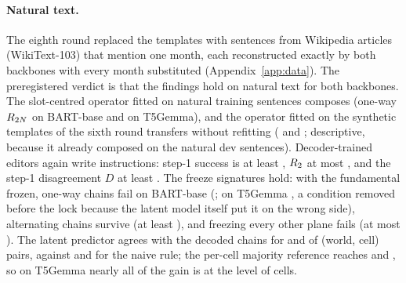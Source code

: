 \paragraph{Natural text.}
The eighth round replaced the templates with \CLseventeenWorlds{} sentences from Wikipedia articles (WikiText-103) that mention one month,
each reconstructed exactly by both backbones with every month substituted (Appendix~\ref{app:data}). The preregistered verdict is that
the findings hold on natural text for both backbones. The slot-centred operator fitted on natural training sentences composes (one-way
$R_{2N}$ \CLseventeenNoneBart{} on BART-base and \CLseventeenNoneTfive{} on T5Gemma), and the operator fitted on the synthetic templates
of the sixth round transfers without refitting (\CLseventeenSynBart{} and \CLseventeenSynTfive{}; descriptive, because it already
composed on the natural dev sentences). Decoder-trained editors again write instructions: step-1 success is at least
\CLseventeenCOneRoneMin{}, $R_{2}$ at most \CLseventeenCOneRtwoMax{}, and the step-1 disagreement $D$ at least \CLseventeenDMin{}. The
freeze signatures hold: with the fundamental frozen, one-way chains fail on BART-base (\CLseventeenFoneBart{}; on T5Gemma
\CLseventeenFoneTfive{}, a condition removed before the lock because the latent model itself put it on the wrong side), alternating chains
survive (at least \CLseventeenFoneAltMin{}), and freezing every other plane fails (at most \CLseventeenFnotMax{}). The latent predictor
agrees with the decoded chains for \CLseventeenAgreeBart{} and \CLseventeenAgreeTfive{} of (world, cell) pairs, against
\CLseventeenNaiveBart{} and \CLseventeenNaiveTfive{} for the naive rule; the per-cell majority reference reaches
\CLseventeenMajBart{} and \CLseventeenMajTfive{}, so on T5Gemma nearly all of the gain is at the level of cells.

